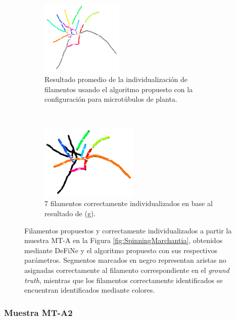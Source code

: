 \begin{figure}[h!]
    \begin{subfigure}[t]{0.49\textwidth}
        \centering
        \includegraphics[height=1.4in]{resultImages/50-ROIs-Spinning-Marchantia-phil-s10-v05-nobg-antLabeled.png}
        \caption{Resultado promedio de la individualizaci\'on de filamentos usando el algoritmo propuesto con la configuraci\'on para microt\'ubulos de planta.}
        \label{SpinningMarchantiaResults-worstPhil}
    \end{subfigure}
    ~
    \begin{subfigure}[t]{0.49\textwidth}
        \centering
        \includegraphics[height=1.4in]{resultImages/50-ROIs-Spinning-Marchantia-phil-s10-v05-exactMatch-antLabeled-thick.png}
        \caption{7 filamentos correctamente individualizados en base al resultado de (g).}
        \label{fig:SpinningMarchantiaResults-worstPhilExact}
    \end{subfigure}
    
    \caption[Filamentos propuestos y correctamente individualizados a partir la muestra MT-A en la Figura \ref{fig:SpinningMarchantia}.]{Filamentos propuestos y correctamente individualizados a partir la muestra MT-A en la Figura \ref{fig:SpinningMarchantia}, obtenidos mediante DeFiNe y el algoritmo propuesto con sus respectivos par\'ametros. Segmentos marcados en negro representan aristas no asignadas correctamente al filamento correspondiente en el {\it ground truth}, mientras que los filamentos correctamente identificados se encuentran identificados mediante colores.}
    \label{fig:SpinningMarchantiaResults}
\end{figure}

\clearpage
\newpage

\subsubsection{Muestra MT-A2}

